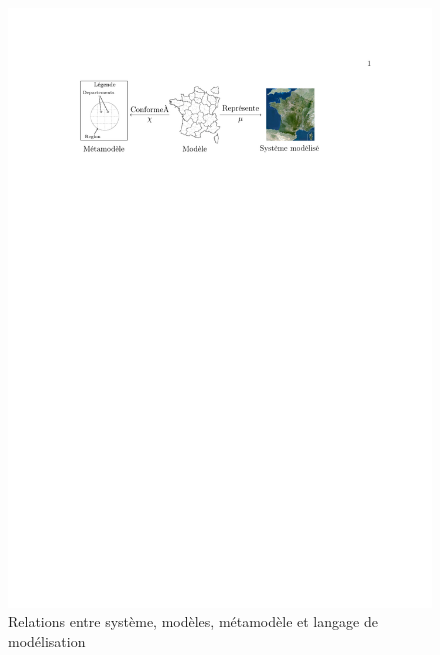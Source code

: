\begin{figure}[!ht]
    \includegraphics[trim= 100 635 400 100]{figures/3_etat_de_l_art_IDM/metamodel_carte.pdf} %
 \caption{Relations entre système, modèles, métamodèle et langage de 
modélisation \protect\cite{favre2006ingenierie}}
 \label{fig:carteFavre}
\end{figure}


